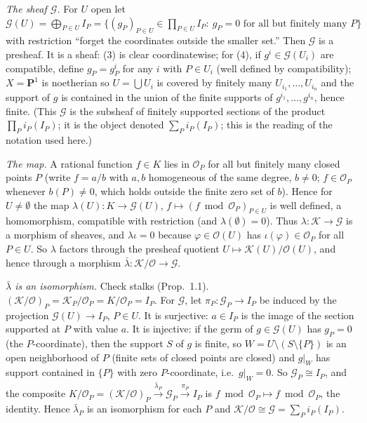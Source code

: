 \documentclass[11pt]{article}
\begin{document}
\emph{The sheaf $\mathcal G$.} For $U$ open let $\mathcal G(U)=\bigoplus_{P\in U}I_P=\{(g_P)_{P\in U}\in\prod_{P\in U}I_P:\ g_P=0\text{ for all but finitely many }P\}$ with restriction ``forget the coordinates outside the smaller set.'' Then $\mathcal G$ is a presheaf. It is a sheaf: (3) is clear coordinatewise; for (4), if $g^i\in\mathcal G(U_i)$ are compatible, define $g_P=g^i_P$ for any $i$ with $P\in U_i$ (well defined by compatibility); $X=\mathbf P^1$ is noetherian so $U=\bigcup U_i$ is covered by finitely many $U_{i_1},\dots,U_{i_n}$ and the support of $g$ is contained in the union of the finite supports of $g^{i_1},\dots,g^{i_n}$, hence finite. (This $\mathcal G$ is the subsheaf of finitely supported sections of the product $\prod_Pi_P(I_P)$; it is the object denoted $\sum_Pi_P(I_P)$; this is the reading of the notation used here.)

\emph{The map.} A rational function $f\in K$ lies in $\mathcal O_P$ for all but finitely many closed points $P$ (write $f=a/b$ with $a,b$ homogeneous of the same degree, $b\ne0$; $f\in\mathcal O_P$ whenever $b(P)\ne0$, which holds outside the finite zero set of $b$). Hence for $U\ne\emptyset$ the map $\lambda(U)\colon K\to\mathcal G(U)$, $f\mapsto(f\bmod\mathcal O_P)_{P\in U}$ is well defined, a homomorphism, compatible with restriction (and $\lambda(\emptyset)=0$). Thus $\lambda\colon\mathcal K\to\mathcal G$ is a morphism of sheaves, and $\lambda\iota=0$ because $\varphi\in\mathcal O(U)$ has $\iota(\varphi)\in\mathcal O_P$ for all $P\in U$. So $\lambda$ factors through the presheaf quotient $U\mapsto\mathcal K(U)/\mathcal O(U)$, and hence through a morphism $\bar\lambda\colon\mathcal K/\mathcal O\to\mathcal G$.

\emph{$\bar\lambda$ is an isomorphism.} Check stalks (Prop.~1.1). $(\mathcal K/\mathcal O)_P=\mathcal K_P/\mathcal O_P=K/\mathcal O_P=I_P$. For $\mathcal G$, let $\pi_P\colon\mathcal G_P\to I_P$ be induced by the projection $\mathcal G(U)\to I_P$, $P\in U$. It is surjective: $a\in I_P$ is the image of the section supported at $P$ with value $a$. It is injective: if the germ of $g\in\mathcal G(U)$ has $g_P=0$ (the $P$-coordinate), then the support $S$ of $g$ is finite, so $W=U\setminus(S\setminus\{P\})$ is an open neighborhood of $P$ (finite sets of closed points are closed) and $g|_W$ has support contained in $\{P\}$ with zero $P$-coordinate, i.e.\ $g|_W=0$. So $\mathcal G_P\cong I_P$, and the composite $K/\mathcal O_P=(\mathcal K/\mathcal O)_P\xrightarrow{\bar\lambda_P}\mathcal G_P\xrightarrow{\pi_P}I_P$ is $f\bmod\mathcal O_P\mapsto f\bmod\mathcal O_P$, the identity. Hence $\bar\lambda_P$ is an isomorphism for each $P$ and $\mathcal K/\mathcal O\cong\mathcal G=\sum_Pi_P(I_P)$.
\end{document}
